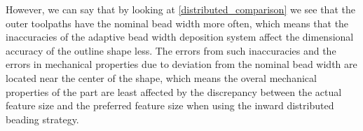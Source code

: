 However, we can say that by looking at \cref{distributed_comparison} we see that the outer toolpaths have the nominal bead width more often, which means that the inaccuracies of the adaptive bead width deposition system affect the dimensional accuracy of the outline shape less.
The errors from such inaccuracies and the errors in mechanical properties due to deviation from the nominal bead width are located near the center of the shape, which means the overal mechanical properties of the part are least affected by the discrepancy between the actual feature size and the preferred feature size when using the inward distributed beading strategy.







